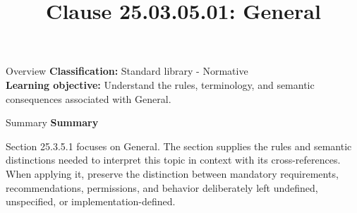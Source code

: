 \documentclass[10pt,letterpaper]{article}
\title{Clause 25.03.05.01: General}
\author{}
\date{}
\begin{document}
\maketitle
\begin{CornellOverviewBox}{Overview}
\textbf{Classification:} Standard library - Normative\\[2pt]
\textbf{Learning objective:} Understand the rules, terminology, and semantic consequences associated with General.
\end{CornellOverviewBox}\begin{CornellSummaryBox}{Summary}
{\sffamily\bfseries\color{Accent} Summary}\par\vspace{3pt}Section 25.3.5.1 focuses on General. The section supplies the rules and semantic distinctions needed to interpret this topic in context with its cross-references. When applying it, preserve the distinction between mandatory requirements, recommendations, permissions, and behavior deliberately left undefined, unspecified, or implementation-defined.
\end{CornellSummaryBox}
\end{document}
